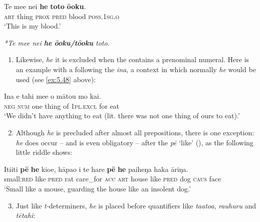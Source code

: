 \ea\label{ex:5.50}
\gll Te me{\ꞌ}e nei \textbf{he} \textbf{toto} \textbf{ō{\ꞌ}oku}. \\
\textsc{art} thing \textsc{prox} \textsc{pred} blood \textsc{poss.1sg.o} \\

\glt 
‘This is my blood.’ \textstyleExampleref{[Luke 22:20]}
\z

\ea\label{ex:5.51}
\textit{*Te me{\ꞌ}e nei \textbf{he} \textbf{ō{\ꞌ}oku}\textbf{/tō{\ꞌ}oku} toto.}
\z

\begin{enumerate}
\item[]
Likewise, \textit{he} it is excluded when the  contains a prenominal numeral. Here is an example with a  following the  \textit{{\ꞌ}ina}, a context in which normally \textit{he} would be used (see \ref{ex:5.48} above):
\end{enumerate}

\ea\label{ex:5.52}
\gll {\ꞌ}Ina e tahi me{\ꞌ}e o mātou mo kai.\\
\textsc{neg} \textsc{num} one thing of \textsc{1pl.excl} for eat\\

\glt 
‘We didn’t have anything to eat (lit. there was not one thing of ours to eat).’ \textstyleExampleref{[R130.002]}  
\z

\begin{enumerate}
\setcounter{enumi}{1}
\item
Although \textit{he} is precluded after almost all prepositions, there is one exception: \textit{he} does occur – and is even obligatory – after the  \textit{pē} ‘like’ (), as the following little riddle shows:
\end{enumerate}

\ea\label{ex:5.53}
\gll {\ꞌ}Iti{\ꞌ}iti \textbf{pē} \textbf{he} kio{\ꞌ}e, hāpa{\ꞌ}o i te hare \textbf{pē} \textbf{he} paiheŋa haka {\ꞌ}āriŋa. \\
small:\textsc{red} like \textsc{pred} rat care\_for \textsc{acc} \textsc{art} house like \textsc{pred} dog \textsc{caus} face\\

\glt 
‘Small like a mouse, guarding the house like an insolent dog.’ \textstyleExampleref{[R144.007]} 
\z

\begin{enumerate}
\setcounter{enumi}{2}
\item
Just like \textit{t-}determiners, \textit{he} is placed before quantifiers like \textit{\mbox{ta{\ꞌ}ato{\ꞌ}a}}, \textit{rauhuru} and \textit{tētahi}:
\end{enumerate}

